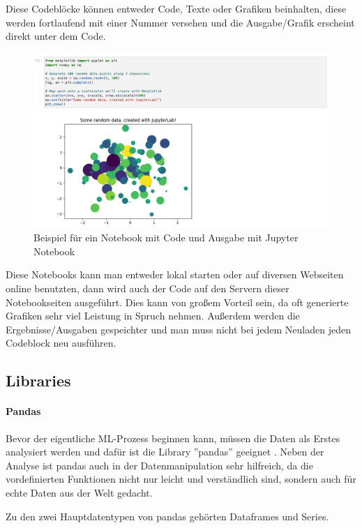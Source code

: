Diese Codeblöcke können entweder Code, Texte oder Grafiken beinhalten, diese werden fortlaufend mit einer Nummer versehen und die Ausgabe/Grafik erscheint direkt unter dem Code.

\begin{figure}[H]
    \centering
    \includegraphics[scale=0.4]{sections/machine-learning/images/jupyter-notebook.png}
    \caption{Beispiel für ein Notebook mit Code und Ausgabe mit Jupyter Notebook}
\end{figure}

Diese Notebooks kann man entweder lokal starten oder auf diversen Webseiten online benutzten, dann wird auch der Code auf den Servern dieser Notebookseiten ausgeführt. Dies kann von großem Vorteil sein, da oft generierte Grafiken sehr viel Leistung in Spruch nehmen. Außerdem werden die Ergebnisse/Ausgaben gespeichter und man muss nicht bei jedem Neuladen jeden Codeblock neu ausführen. 

\subsection{Libraries}

\paragraph{Pandas}

Bevor der eigentliche ML-Prozess beginnen kann, müssen die Daten als Erstes analysiert werden und dafür ist die Library ''pandas'' geeignet . Neben der Analyse ist pandas auch in der Datenmanipulation sehr hilfreich, da die vordefinierten Funktionen nicht nur leicht und verständlich sind, sondern auch für echte Daten aus der Welt gedacht.

Zu den zwei Hauptdatentypen von pandas gehörten Dataframes und Series.

